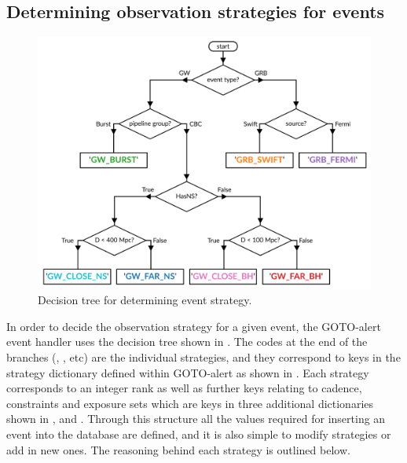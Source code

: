 \subsection{Determining observation strategies for events}
\label{sec:event_strategy}
\begin{colsection}


\begin{figure}[t]
    \begin{center}
        \includegraphics[width=\linewidth]{images/strategy_flowchart.pdf}
    \end{center}
    \caption[Decision tree for determining event strategy]{
        Decision tree for determining event strategy.
    }\label{fig:strategy_flowchart}
\end{figure}

In order to decide the observation strategy for a given event, the GOTO-alert event handler uses the decision tree shown in . The codes at the end of the branches (, , etc) are the individual strategies, and they correspond to keys in the strategy dictionary defined within GOTO-alert as shown in . Each strategy corresponds to an integer rank as well as further keys relating to cadence, constraints and exposure sets which are keys in three additional dictionaries shown in ,  and .  Through this structure all the values required for inserting an event into the database are defined, and it is also simple to modify strategies or add in new ones. The reasoning behind each strategy is outlined below.


\end{colsection}
